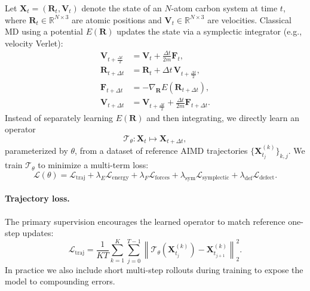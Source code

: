 \documentclass{article}
\begin{document}
Let $\mathbf{X}_t = (\mathbf{R}_t, \mathbf{V}_t)$ denote the state of an $N$-atom carbon system at time $t$, where $\mathbf{R}_t \in \mathbb{R}^{N \times 3}$ are atomic positions and $\mathbf{V}_t \in \mathbb{R}^{N \times 3}$ are velocities. Classical MD using a potential $E(\mathbf{R})$ updates the state via a symplectic integrator (e.g., velocity Verlet):
\begin{align}
    \mathbf{V}_{t+\frac{\Delta t}{2}} &= \mathbf{V}_t + \frac{\Delta t}{2m} \mathbf{F}_t, \\
    \mathbf{R}_{t+\Delta t} &= \mathbf{R}_t + \Delta t\, \mathbf{V}_{t+\frac{\Delta t}{2}}, \\
    \mathbf{F}_{t+\Delta t} &= -\nabla_{\mathbf{R}} E(\mathbf{R}_{t+\Delta t}), \\
    \mathbf{V}_{t+\Delta t} &= \mathbf{V}_{t+\frac{\Delta t}{2}} + \frac{\Delta t}{2m} \mathbf{F}_{t+\Delta t}.
\end{align}
Instead of separately learning $E(\mathbf{R})$ and then integrating, we directly learn an operator
\begin{equation}
    \mathcal{T}_\theta : \mathbf{X}_t \mapsto \mathbf{X}_{t+\Delta t},
\end{equation}
parameterized by $\theta$, from a dataset of reference AIMD trajectories $\{\mathbf{X}^{(k)}_{t_j}\}_{k,j}$. We train $\mathcal{T}_\theta$ to minimize a multi-term loss:
\begin{equation}
    \mathcal{L}(\theta) = \mathcal{L}_\text{traj} + \lambda_E \mathcal{L}_\text{energy} + \lambda_F \mathcal{L}_\text{forces} + \lambda_\text{sym} \mathcal{L}_\text{symplectic} + \lambda_\text{def} \mathcal{L}_\text{defect}.
\end{equation}

\paragraph{Trajectory loss.}
The primary supervision encourages the learned operator to match reference one-step updates:
\begin{equation}
    \mathcal{L}_\text{traj} = \frac{1}{K T} \sum_{k=1}^K \sum_{j=0}^{T-1} \left\| \mathcal{T}_\theta(\mathbf{X}^{(k)}_{t_j}) - \mathbf{X}^{(k)}_{t_{j+1}} \right\|_2^2.
\end{equation}
In practice we also include short multi-step rollouts during training to expose the model to compounding errors.
\end{document}
